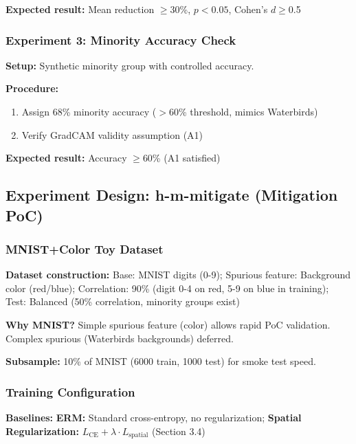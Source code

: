 \textbf{Expected result:} Mean reduction $\geq$30\%, $p<0.05$, Cohen's $d\geq$0.5

\subsubsection{Experiment 3: Minority Accuracy Check}

\textbf{Setup:} Synthetic minority group with controlled accuracy.

\textbf{Procedure:}
\begin{enumerate}
\item Assign 68\% minority accuracy ($>$60\% threshold, mimics Waterbirds)
\item Verify GradCAM validity assumption (A1)
\end{enumerate}

\textbf{Expected result:} Accuracy $\geq$60\% (A1 satisfied)

\subsection{Experiment Design: h-m-mitigate (Mitigation PoC)}

\subsubsection{MNIST+Color Toy Dataset}

\textbf{Dataset construction:}
Base: MNIST digits (0-9); Spurious feature: Background color (red/blue); Correlation: 90\% (digit 0-4 on red, 5-9 on blue in training); Test: Balanced (50\% correlation, minority groups exist)

\textbf{Why MNIST?} Simple spurious feature (color) allows rapid PoC validation. Complex spurious (Waterbirds backgrounds) deferred.

\textbf{Subsample:} 10\% of MNIST (6000 train, 1000 test) for smoke test speed.

\subsubsection{Training Configuration}

\textbf{Baselines:}
\textbf{ERM:} Standard cross-entropy, no regularization;
\textbf{Spatial Regularization:} $L_{\text{CE}} + \lambda \cdot L_{\text{spatial}}$ (Section 3.4)

